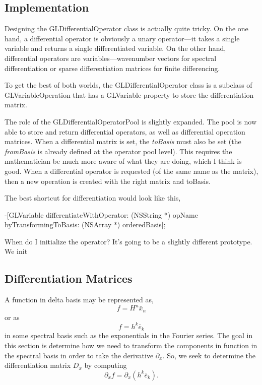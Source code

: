 \documentclass[11pt]{article}
\begin{document}
%
\subsection{Implementation}
%

Designing the GLDifferentialOperator class is actually quite tricky. On the one hand, a differential operator is obviously a unary operator---it takes a single variable and returns a single differentiated variable. On the other hand, differential operators are variables---wavenumber vectors for spectral differentiation or sparse differentiation matrices for finite differencing.

To get the best of both worlds, the GLDifferentialOperator class is a subclass of GLVariableOperation that has a GLVariable property to store the differentiation matrix.

The role of the GLDifferentialOperatorPool is slightly expanded. The pool is now able to store and return differential operators, as well as differential operation matrices. When a differential matrix is set, the \emph{toBasis} must also be set (the \emph{fromBasis} is already defined at the operator pool level). This requires the mathematician be much more aware of what they are doing, which I think is good. When a differential operator is requested (of the same name as the matrix), then a new operation is created with the right matrix and toBasis.

The best shortcut for differentiation would look like this,

-[GLVariable differentiateWithOperator: (NSString *) opName byTransformingToBasis: (NSArray *) orderedBasis];

When do I initialize the operator? It's going to be a slightly different prototype. We init

%
\subsection{Differentiation Matrices}
%

A function in delta basis may be represented as,
\begin{equation}
f = H^n \bar{x}_n
\end{equation}
or as
\begin{equation}
f = h^k \bar{e}_k
\end{equation}
in some spectral basis such as the exponentials in the Fourier series. The goal in this section is determine how we need to transform the components in function in the spectral basis in order to take the derivative $\partial_x$. So, we seek to determine the differentiation matrix $D_x$ by computing
\begin{equation}
\partial_x f= \partial_x\left( h^k \bar{e}_k \right).
\end{equation}
\end{document}
